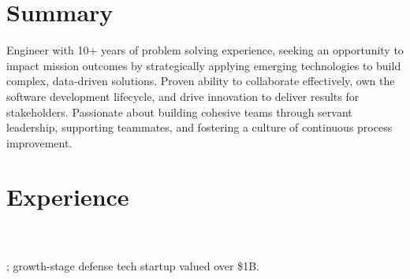 %
%
\sectionsep
\section{Summary}

\raggedright

Engineer with 10+ years of problem solving experience, seeking an opportunity to impact mission outcomes by strategically applying emerging technologies to build complex, data-driven solutions.
Proven ability to collaborate effectively, own the software development lifecycle, and drive innovation to deliver results for stakeholders.
Passionate about building cohesive teams through servant leadership, supporting teammates, and fostering a culture of continuous process improvement.

\sectionsep

\section{Experience}
\\
\\
; growth-stage defense tech startup valued over \$1B.

